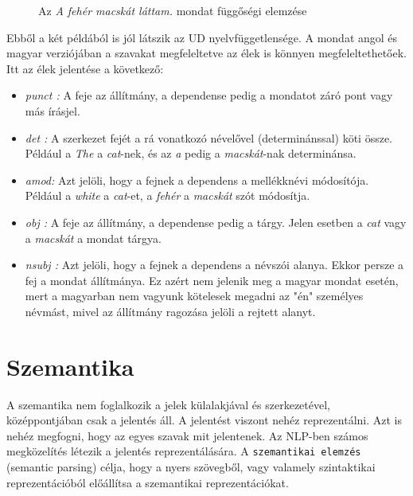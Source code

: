 \begin{figure}[h]
\centering 
{}
\caption{Az \textit{A fehér macskát láttam.} mondat függőségi elemzése}
\label{fig:deptreeHU}  
\end{figure}

Ebből a két példából is jól látszik az UD nyelvfüggetlensége. A mondat angol és magyar verziójában a szavakat megfeleltetve az élek is könnyen megfeleltethetőek.
Itt az élek jelentése a következő:
\begin{itemize}
\item \emph{punct : } 
A feje az állítmány, a dependense pedig a mondatot záró pont vagy más írásjel.
\item \emph{det : } 
A szerkezet fejét a rá vonatkozó névelővel (determinánssal) köti össze. 
Például a \textit{The} a \textit{cat}-nek, és az \textit{a} pedig a \textit{macskát}-nak determinánsa.
\item \emph{amod: } 
Azt jelöli, hogy a fejnek a dependens a mellékknévi módosítója.
Például a \textit{white} a \textit{cat}-et, a \textit{fehér} a \textit{macskát} szót módosítja.
\item \emph{obj : }  
A feje az állítmány, a dependense pedig a tárgy.
Jelen esetben a \textit{cat} vagy a \textit{macskát} a mondat tárgya.
\item \emph{nsubj : } 
Azt jelöli, hogy a fejnek a dependens a névszói alanya. 
Ekkor persze a fej a mondat állítmánya.
Ez azért nem jelenik meg a magyar mondat esetén, mert a magyarban nem vagyunk kötelesek megadni az "én" személyes névmást, mivel az állítmány ragozása jelöli a rejtett alanyt.
\end{itemize}

\section{Szemantika}
\label{sec:semantics}

A szemantika nem foglalkozik a jelek külalakjával és szerkezetével, középpontjában csak a jelentés áll.
A jelentést viszont nehéz reprezentálni. 
Azt is nehéz megfogni, hogy az egyes szavak mit jelentenek.
Az NLP-ben számos megközelítés létezik a jelentés reprezentálására. 
A \texttt{szemantikai elemzés} (semantic parsing) célja, hogy a nyers szövegből, vagy valamely szintaktikai reprezentációból előállítsa a szemantikai reprezentációkat.

